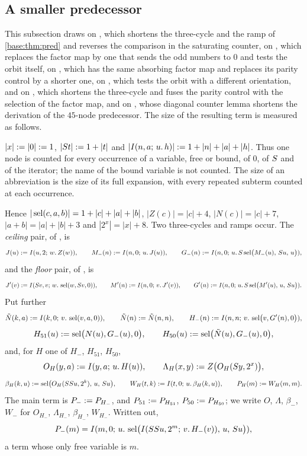 \subsection{A smaller predecessor}
\label{base:sec:pred57}

This subsection draws on , which shortens the
three-cycle and the ramp of \cref{base:thm:pred} and reverses the
comparison in the saturating counter, on , which
replaces the factor map by one that sends the odd numbers to $0$ and tests
the orbit itself, on , which has the same
absorbing factor map and replaces its parity control by a shorter one, on
, which tests the orbit with a different orientation, and on
, which shortens the three-cycle and fuses the parity
control with the selection of the factor map, and on ,
whose diagonal counter lemma shortens the derivation of the $45$-node
predecessor.
The size of the resulting term is measured as follows.

\begin{definition}
\label{base:def:termsize}
$|x|\mathrel{:=}|0|\mathrel{:=} 1$, $|S t|\mathrel{:=} 1+|t|$ and
$|I(n,a;\,u.\,h)|\mathrel{:=} 1+|n|+|a|+|h|$.  Thus one node is counted for
every occurrence of a variable, free or bound, of $0$, of $S$ and of the
iterator; the name of the bound variable is not counted.  The size of an
abbreviation is the size of its full expansion, with every repeated
subterm counted at each occurrence.
\end{definition}

Hence $|\operatorname{sel}(c,a,b)|=1+|c|+|a|+|b|$, $|Z(c)|=|c|+4$, $|N(c)|=|c|+7$,
$|a+b|=|a|+|b|+3$ and $|2^{x}|=|x|+8$.  Two three-cycles and ramps
occur.  The \emph{ceiling} pair, of , is
\[
 J(u)\mathrel{:=}I(u,2;\,w.\,Z(w)),\qquad
 M_-(n)\mathrel{:=}I(n,0;\,u.\,J(u)),\qquad
 G_-(n)\mathrel{:=}I(n,0;\,u.\,S\operatorname{sel}\bigl(M_-(u),\,S u,\,u\bigr)),
\]
and the \emph{floor} pair, of , is
\[
 J'(v)\mathrel{:=}I(S v,v;\,w.\,\operatorname{sel}(w,S v,0)),\qquad
 M'(n)\mathrel{:=}I(n,0;\,v.\,J'(v)),\qquad
 G'(n)\mathrel{:=}I(n,0;\,u.\,S\operatorname{sel}\bigl(M'(u),\,u,\,S u\bigr)).
\]
Put further
\[
 \tilde N(k,a)\mathrel{:=}I(k,0;\,v.\,\operatorname{sel}(v,a,0)),\qquad
 \tilde N(n)\mathrel{:=}\tilde N(n,n),\qquad
 H_-(n)\mathrel{:=}I(n,n;\,v.\,\operatorname{sel}\bigl(v,G'(n),0\bigr)),
\]
\[
 H_{51}(u)\mathrel{:=}\operatorname{sel}\bigl(N(u),G_-(u),0\bigr),\qquad
 H_{50}(u)\mathrel{:=}\operatorname{sel}\bigl(\tilde N(u),G_-(u),0\bigr),
\]
and, for $H$ one of $H_-$, $H_{51}$, $H_{50}$,
\[
 O_H(y,a)\mathrel{:=}I(y,a;\,u.\,H(u)),\qquad
 \Lambda_H(x,y)\mathrel{:=} Z\bigl(O_H(S y,2^{x})\bigr),
\]
\[
 \beta_H(k,u)\mathrel{:=}\operatorname{sel}\bigl(O_H(SS u,2^{k}),\,u,\,S u\bigr),\qquad
 W_H(t,k)\mathrel{:=}I(t,0;\,u.\,\beta_H(k,u)),\qquad
 P_H(m)\mathrel{:=} W_H(m,m).
\]
The main term is $P_-\mathrel{:=} P_{H_-}$, and $P_{51}\mathrel{:=} P_{H_{51}}$,
$P_{50}\mathrel{:=} P_{H_{50}}$; we write $O$, $\Lambda$, $\beta_-$, $W_-$ for
$O_{H_-}$, $\Lambda_{H_-}$, $\beta_{H_-}$, $W_{H_-}$.  Written out,
\[
 P_-(m)=I(m,0;\,u.\,\operatorname{sel}\bigl(I(SS u,2^{m};\,v.\,H_-(v)),\,u,\,S u\bigr)),
\]
a term whose only free variable is $m$.

